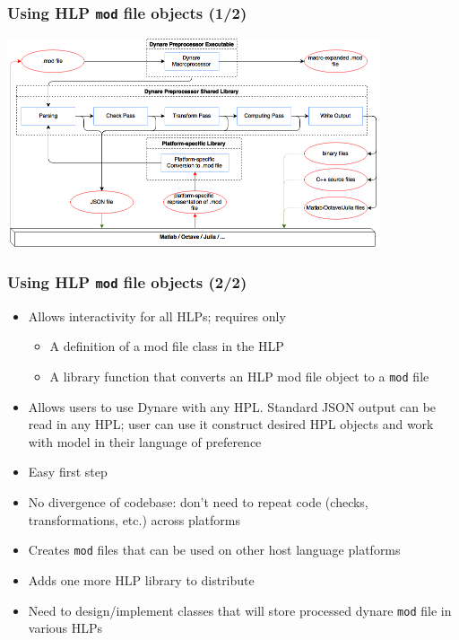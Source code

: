 \documentclass{beamer}
\begin{document}
\begin{frame}
  \frametitle{Using HLP \texttt{mod} file objects (1/2)}
  \begin{center}
    \includegraphics[width=11cm]{json-preprocessor.png}
  \end{center}
\end{frame}

\begin{frame}
  \frametitle{Using HLP \texttt{mod} file objects (2/2)}
  \begin{itemize}
  \item Allows interactivity for all HLPs; requires only
    \begin{itemize}
    \item A definition of a mod file class in the HLP
    \item A library function that converts an HLP mod file object to a \texttt{mod} file
    \end{itemize}
  \item Allows users to use Dynare with any HPL. Standard JSON output can be read in any HPL; user can use it construct desired HPL objects and work with model in their language of preference
  \item Easy first step
  \item No divergence of codebase: don't need to repeat code (checks, transformations, etc.) across platforms
  \item Creates \texttt{mod} files that can be used on other host language platforms
  \item Adds one more HLP library to distribute
  \item Need to design/implement classes that will store processed dynare \texttt{mod} file in various HLPs
  \end{itemize}
\end{frame}
\end{document}
